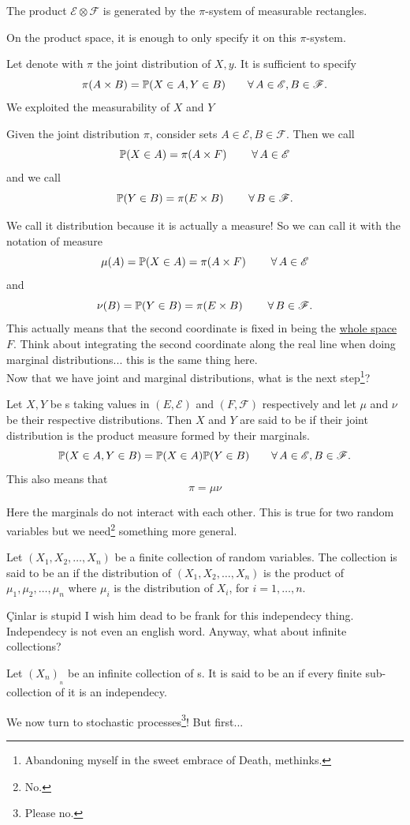 \documentclass{report}
\begin{document}
\begin{remark}
	The product \sa{} $\mathscr{E}\otimes\mathscr{F}$ is generated by the $\pi$-system of measurable rectangles.
\end{remark}
On the product space, it is enough to only specify it on this $\pi$-system.\par
Let denote with $\pi$ the joint distribution of $X,y$. It is sufficient to specify
\[\pi(A\times B)=\mathbb{P}(X\in A, Y\in B)\qquad\forall\,  A\in\mathscr{E},B\in\mathscr{F}.\]
We exploited the measurability of $X$ and $Y$
\begin{definition}
	Given the joint distribution $\pi$, consider sets $A\in\mathscr{E},B\in\mathscr{F}$. Then we call 
	\[\mathbb{P}(X\in A)=\pi(A\times F)\qquad\;\forall\,  A\in\mathscr{E}\]
	and we call 
	\[\mathbb{P}(Y\in B)=\pi(E\times B)\qquad\;\forall\,  B\in\mathscr{F}.\]
\end{definition}
We call it distribution because it is actually a measure! So we can call it with the notation of measure
	\[\mu(A)=\mathbb{P}(X\in A)=\pi(A\times F)\qquad\;\forall\,  A\in\mathscr{E}\] and \[\nu(B)=\mathbb{P}(Y\in B)=\pi(E\times B)\qquad\;\forall\,  B\in\mathscr{F}.\]This actually means that the second coordinate is fixed in being the \underline{whole space} $F$. Think about integrating the second coordinate along the real line when doing marginal distributions... this is the same thing here.\\
Now that we have joint and marginal distributions, what is the next step\footnote{Abandoning myself in the sweet embrace of Death, methinks.}?
\begin{definition}
	Let $X,Y$ be \rv s taking values in $(E,\mathscr{E})$ and $(F,\mathscr{F})$ respectively and let $\mu$ and $\nu$ be their respective distributions. Then $X$ and $Y$ are said to be  if their joint distribution is the product measure formed by their marginals.
	\[\mathbb{P}(X\in A,Y\in B)=\mathbb{P}(X\in A)\mathbb{P}(Y\in B)\qquad\forall\,  A\in \mathscr{E},B\in\mathscr{F}.\]
	This also means that 
	\[\pi=\mu\nu\]
\end{definition}
Here the marginals do not interact with each other. This is true for two random variables but we need\footnote{No.} something more general.
\begin{definition}
Let $(X_1,X_2,\ldots,X_n)$ be a finite collection of random variables. The collection is said to be an  if the distribution of $(X_1,X_2,\ldots,X_n)$ is the product of $\mu_1,\mu_2,\ldots,\mu_n$ where $\mu_i$ is the distribution of $X_i$, for $i=1,\ldots,n$.
\end{definition}
Çinlar is stupid I wish him dead to be frank for this independecy thing. Independecy is not even an english word. Anyway, what about infinite collections?
\begin{definition}
	Let $(X_n)_{_n}$ be an infinite collection of \rv s. It is said to be an  if every finite sub-collection of it is an independecy.
\end{definition}
We now turn to stochastic processes\footnote{Please no.}! But first...
\end{document}
